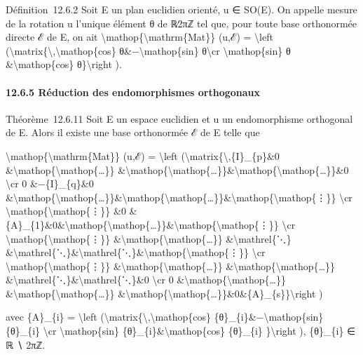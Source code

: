\documentclass[]{article}
\begin{document}
Définition~12.6.2 Soit E un plan euclidien orienté, u ∈ SO(E). On
appelle mesure de la rotation u l'unique élément θ de ℝ∕2πℤ tel que,
pour toute base orthonormée directe ℰ de E, on ait
\textbackslash{}mathop\{\textbackslash{}mathrm\{Mat\}\} (u,ℰ) =
\textbackslash{}left
(\textbackslash{}matrix\{\textbackslash{},\textbackslash{}mathop\{cos\}
θ\&−\textbackslash{}mathop\{sin\} θ\textbackslash{}cr
\textbackslash{}mathop\{sin\} θ \&\textbackslash{}mathop\{cos\}
θ\}\textbackslash{}right ).

\paragraph{12.6.5 Réduction des endomorphismes orthogonaux}

Théorème~12.6.11 Soit E un espace euclidien et u un endomorphisme
orthogonal de E. Alors il existe une base orthonormée ℰ de E telle que

\textbackslash{}mathop\{\textbackslash{}mathrm\{Mat\}\} (u,ℰ) =
\textbackslash{}left
(\textbackslash{}matrix\{\textbackslash{},\{I\}\_\{p\}\&0
\&\textbackslash{}mathop\{\textbackslash{}mathop\{\ldots{}\}\}
\&\textbackslash{}mathop\{\textbackslash{}mathop\{\ldots{}\}\}\&\textbackslash{}mathop\{\textbackslash{}mathop\{\ldots{}\}\}\&0
\textbackslash{}cr 0 \&−\{I\}\_\{q\}\&0
\&\textbackslash{}mathop\{\textbackslash{}mathop\{\ldots{}\}\}\&\textbackslash{}mathop\{\textbackslash{}mathop\{\ldots{}\}\}\&\textbackslash{}mathop\{\textbackslash{}mathop\{⋮\}\}
\textbackslash{}cr \textbackslash{}mathop\{\textbackslash{}mathop\{⋮\}\}
\&0
\&\{A\}\_\{1\}\&0\&\textbackslash{}mathop\{\textbackslash{}mathop\{\ldots{}\}\}\&\textbackslash{}mathop\{\textbackslash{}mathop\{⋮\}\}
\textbackslash{}cr \textbackslash{}mathop\{\textbackslash{}mathop\{⋮\}\}
\&\textbackslash{}mathop\{\textbackslash{}mathop\{\ldots{}\}\}
\&\textbackslash{}mathrel\{⋱\}
\&\textbackslash{}mathrel\{⋱\}\&\textbackslash{}mathrel\{⋱\}\&\textbackslash{}mathop\{\textbackslash{}mathop\{⋮\}\}
\textbackslash{}cr \textbackslash{}mathop\{\textbackslash{}mathop\{⋮\}\}
\&\textbackslash{}mathop\{\textbackslash{}mathop\{\ldots{}\}\}
\&\textbackslash{}mathop\{\textbackslash{}mathop\{\ldots{}\}\}
\&\textbackslash{}mathrel\{⋱\}\&\textbackslash{}mathrel\{⋱\}\&0
\textbackslash{}cr 0
\&\textbackslash{}mathop\{\textbackslash{}mathop\{\ldots{}\}\}
\&\textbackslash{}mathop\{\textbackslash{}mathop\{\ldots{}\}\}
\&\textbackslash{}mathop\{\textbackslash{}mathop\{\ldots{}\}\}\&0\&\{A\}\_\{s\}\}\textbackslash{}right
)

avec \{A\}\_\{i\} = \textbackslash{}left
(\textbackslash{}matrix\{\textbackslash{},\textbackslash{}mathop\{cos\}
\{θ\}\_\{i\}\&−\textbackslash{}mathop\{sin\} \{θ\}\_\{i\}
\textbackslash{}cr \textbackslash{}mathop\{sin\}
\{θ\}\_\{i\}\&\textbackslash{}mathop\{cos\} \{θ\}\_\{i\}
\}\textbackslash{}right ), \{θ\}\_\{i\} ∈ ℝ ∖ 2πℤ.
\end{document}
